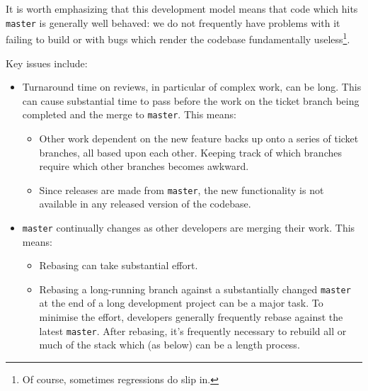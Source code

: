 \documentclass[DM,toc]{lsstdoc}
\begin{document}
It is worth emphasizing that this development model means that code which hits
\texttt{master} is generally well behaved: we do not frequently have problems
with it failing to build or with bugs which render the codebase fundamentally
useless\footnote{Of course, sometimes regressions do slip in.}.

Key issues include:

\begin{itemize}

  \item{Turnaround time on reviews, in particular of complex work, can be
  long.  This can cause substantial time to pass before the work on the ticket
  branch being completed and the merge to \texttt{master}. This means:

    \begin{itemize}

      \item{Other work dependent on the new feature backs up onto a series of
      ticket branches, all based upon each other. Keeping track of which
      branches require which other branches becomes awkward.}

      \item{Since releases are made from \texttt{master}, the new
      functionality is not available in any released version of the codebase.}

    \end{itemize}

  }

  \item{\texttt{master} continually changes as other developers are merging
  their work. This means:

    \begin{itemize}

     \item{Rebasing can take substantial effort.}

      \item{Rebasing a long-running branch against a substantially changed
      \texttt{master} at the end of a long development project can be a major
      task. To minimise the effort, developers generally frequently rebase
      against the latest \texttt{master}. After rebasing, it's frequently
      necessary to rebuild all or much of the stack which (as below) can be a
      length process.}

    \end{itemize}

  }


\end{itemize}
\end{document}
